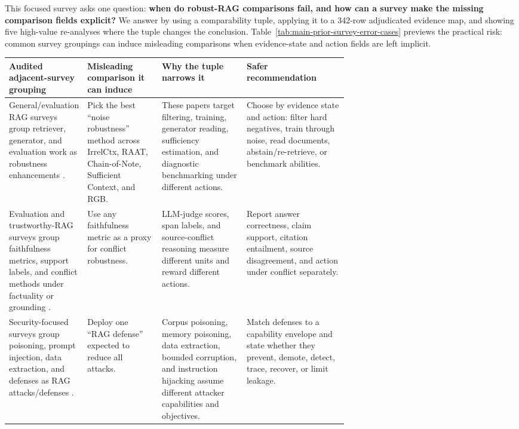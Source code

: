 \documentclass[11pt]{article}
\begin{document}
This focused survey asks one question: \textbf{when do robust-RAG comparisons fail, and how can a survey make the missing comparison fields explicit?} We answer by using a comparability tuple, applying it to a 342-row adjudicated evidence map, and showing five high-value re-analyses where the tuple changes the conclusion. Table~\ref{tab:main-prior-survey-error-cases} previews the practical risk: common survey groupings can induce misleading comparisons when evidence-state and action fields are left implicit.

\begin{table}[t]
\centering
\scriptsize
\renewcommand{\arraystretch}{0.88}
\begin{tabularx}{\linewidth}{>{\raggedright\arraybackslash}p{0.19\linewidth}>{\raggedright\arraybackslash}p{0.22\linewidth}>{\raggedright\arraybackslash}p{0.25\linewidth}X}
\toprule
\textbf{Audited adjacent-survey grouping} & \textbf{Misleading comparison it can induce} & \textbf{Why the tuple narrows it} & \textbf{Safer recommendation} \\
\midrule
General/evaluation RAG surveys group retriever, generator, and evaluation work as robustness enhancements \citep{ragSurvey2024,ragComprehensive2025,ragEvaluationSurvey2024}. & Pick the best ``noise robustness'' method across IrrelCtx, RAAT, Chain-of-Note, Sufficient Context, and RGB. & These papers target filtering, training, generator reading, sufficiency estimation, and diagnostic benchmarking under different actions. & Choose by evidence state and action: filter hard negatives, train through noise, read documents, abstain/re-retrieve, or benchmark abilities. \\
Evaluation and trustworthy-RAG surveys group faithfulness metrics, support labels, and conflict methods under factuality or grounding \citep{ragEvaluationSurvey2024,trustRAGCompass2024,trustworthyRAGSurvey2025}. & Use any faithfulness metric as a proxy for conflict robustness. & LLM-judge scores, span labels, and source-conflict reasoning measure different units and reward different actions. & Report answer correctness, claim support, citation entailment, source disagreement, and action under conflict separately. \\
Security-focused surveys group poisoning, prompt injection, data extraction, and defenses as RAG attacks/defenses \citep{securityRAGSurvey2026,trustworthyRAGSurvey2025}. & Deploy one ``RAG defense'' expected to reduce all attacks. & Corpus poisoning, memory poisoning, data extraction, bounded corruption, and instruction hijacking assume different attacker capabilities and objectives. & Match defenses to a capability envelope and state whether they prevent, demote, detect, trace, recover, or limit leakage. \\

\end{tabularx}
\end{table}
\end{document}
